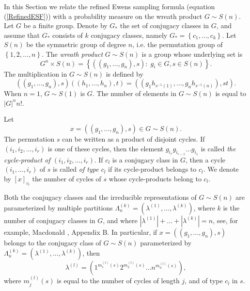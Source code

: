 \documentclass[12pt]{amsart}
\theoremstyle{definition}
\numberwithin{equation}{section}
\begin{document}
In this Section we relate the refined Ewens sampling formula (equation (\ref{RefinedESF})) with a probability measure
on the wreath product $G\sim S(n)$.
Let $G$ be a finite group. Denote by $G_{\ast}$ the set of conjugacy classes in $G$, and
 assume that $G_{\ast}$ consists of $k$ conjugacy classes, namely $G_{\ast}=\left\{c_1,\ldots,c_k\right\}$.
Let $S(n)$ be the symmetric group of degree $n$, i.e.
the permutation group of $\left\{1,2,\ldots,n\right\}$.
The \textit{wreath product} $G\sim S(n)$ is a group whose underlying set is
$$
G^n\times S(n)=\left\{\left(\left(g_1,\ldots,g_n\right),s\right):\;g_i\in G, s\in S(n)\right\}.
$$
The multiplication in $G\sim S(n)$ is defined by
$$
\left((g_1,\ldots,g_n),s\right)\left((h_1,\ldots,h_n),t\right)=
\left((g_1h_{s^{-1}(1)},\ldots,g_nh_{s^{-1}(n)}),st\right).
$$
When $n=1$, $G\sim S(1)$ is $G$. The number of elements in $G\sim S(n)$ is equal to $|G|^nn!$.

Let
\begin{equation}\label{Rest1}
x=\left(\left(g_1,\ldots,g_n\right),s\right)\in G\sim S(n).
\end{equation}
The permutation $s$ can be written as a product of disjoint cycles. If
$(i_1,i_2,\ldots,i_r)$ is one of these cycles, then the element
$g_{i_{r}}g_{i_{r-1}}\ldots g_{i_1}$ is called \textit{the cycle-product of $(i_1,i_2,\ldots,i_r)$}.
If $c_l$ is a conjugacy class in $G$, then
a cycle $(i_1,\ldots,i_r)$  of $s$ is called \textit{of type $c_l$}
if its cycle-product   belongs to $c_l$.  We denote by $[x]_{c_l}$
the number of cycles of $s$ whose cycle-products belong to $c_l$.














Both the conjugacy classes and the irreducible representations of $G\sim S(n)$ are parameterized by multiple partitions $\Lambda_n^{(k)}=\left(\lambda^{(1)},\ldots,\lambda^{(k)}\right)$,
where $k$ is the number of conjugacy classes in $G$, and where $|\lambda^{(1)}|+\ldots+|\lambda^{(k)}|=n$, see, for example, Macdonald
\cite{Macdonald}, Appendix B. In particular, if
$x=\left(\left(g_1,\ldots,g_n\right),s\right)$ belongs to the conjugacy class
 of $G\sim S(n)$  parameterized by $\Lambda_n^{(k)}=\left(\lambda^{(1)},\ldots,\lambda^{(k)}\right)$, then
$$
\lambda^{(l)}=\left(1^{m_1^{(l)}(s)}2^{m_2^{(l)}(s)}\ldots n^{m_n^{(l)}(s)}\right),
$$
where $m_j^{(l)}(s)$ is equal to the number of cycles of length $j$, and of type $c_l$ in $s$.
\end{document}
